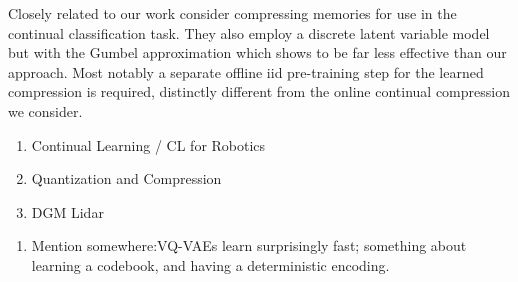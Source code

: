 \documentclass[colorinlistoftodos]{article} %
\begin{document}
Closely related to our work \cite{scalable2017} consider compressing memories for use in the continual classification task. They also employ a discrete latent variable model but with the Gumbel approximation which shows to be far less effective than our approach. Most notably a separate offline iid pre-training step for the learned compression is required, distinctly different from the online continual compression we consider. 

\begin{enumerate}
    \item Continual Learning / CL for Robotics
    \item Quantization and Compression
    \item DGM Lidar \citep{caccia2018deep}
\end{enumerate}



\begin{enumerate}
    \item Mention somewhere:VQ-VAEs learn surprisingly fast; something about learning a codebook, and having a deterministic encoding.

\end{enumerate}




\end{document}
